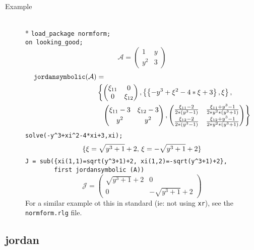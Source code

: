 \begin{description}
\item[Example]\mbox{}\\*
%
\texttt{load\_package normform;}\\
\texttt{on looking\_good;}
\[
\mathcal{A} = \begin{pmatrix} 1 & y \\ y^2 & 3 \end{pmatrix}
\]
\[
\begin{split}
\texttt{jordansymbolic}(\mathcal{A}) &= \\
 & \left\{
     \begin{pmatrix} \xi_{11} & 0 \\ 0 & \xi_{12} \end{pmatrix} ,
     \left\{ \left\{ -y^3+\xi^2-4*\xi+3 \right\}, \xi \right\}, \right. \\
 & \hspace{0.1in} \left.
       \begin{pmatrix} \xi_{11} -3 & \xi_{12} -3 \\[1mm] y^2 & y^2 \end{pmatrix},
       \begin{pmatrix} \frac{\xi_{11} -2} {2*(y^3-1)}
                 & \frac{\xi_{11} + y^3 -1}{2*y^2*(y^3+1)} \\[1mm]
                \frac{\xi_{12} -2}{2*(y^3-1)}
                 & \frac{\xi_{12}+y^3-1}{2*y^2*(y^3+1)}
       \end{pmatrix}
  \right\}
\end{split}
\]
\texttt{solve(-y\^{}3+xi\^{}2-4*xi+3,xi);}
\[
\{ \xi = \sqrt{y^3+1} + 2,\, \xi = -\sqrt{y^3+1}+2 \} \\
\]
\texttt{J = sub(\{xi(1,1)=sqrt(y\^{}3+1)+2, xi(1,2)=-sqrt(y\^{}3+1)+2\},
   \mbox{}\ \ \ \ \ \ \ \ first  jordansymbolic (A))}
%
\[
\mathcal{J} = \begin{pmatrix} \sqrt{y^3+1} + 2 & 0 \\ 0 &
-\sqrt{y^3+1} + 2 \end{pmatrix}
\]
For a similar example ot this in standard {\REDUCE} (ie: not using
\texttt{xr}), see the \texttt{normform.rlg} file.
\end{description}

\subsection{jordan}

